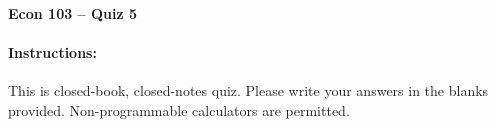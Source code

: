 \documentclass[addpoints,10pt]{exam}
\begin{document}
\thispagestyle{empty}

\noindent \textbf{Econ 103 -- Quiz 5}

\vspace{15pt}
\noindent
{}\hfill 
\paragraph{Instructions: } This is closed-book, closed-notes quiz. Please write your answers in the blanks provided. Non-programmable calculators are permitted.

\vspace{5pt}

\setlength\answerlinelength{6in}
\end{document}

